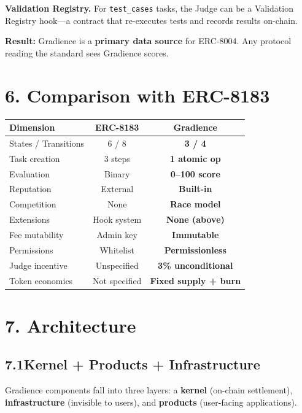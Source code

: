 \documentclass[11pt,a4paper]{article}
\begin{document}
\textbf{Validation Registry.} For \texttt{test\_cases} tasks, the Judge can be a Validation Registry hook---a contract that re-executes tests and records results on-chain.

\textbf{Result:} Gradience is a \textbf{primary data source} for ERC-8004. Any protocol reading the standard sees Gradience scores.

\section{6. Comparison with ERC-8183}

\begin{table}[H]\centering\small
\begin{tabular}{@{}lcc@{}}
\toprule
\textbf{Dimension} & \textbf{ERC-8183} & \textbf{Gradience} \\
\midrule
States / Transitions & 6 / 8 & \textbf{3 / 4} \\
Task creation & 3 steps & \textbf{1 atomic op} \\
Evaluation & Binary & \textbf{0--100 score} \\
Reputation & External & \textbf{Built-in} \\
Competition & None & \textbf{Race model} \\
Extensions & Hook system & \textbf{None (above)} \\
Fee mutability & Admin key & \textbf{Immutable} \\
Permissions & Whitelist & \textbf{Permissionless} \\
Judge incentive & Unspecified & \textbf{3\% unconditional} \\
Token economics & Not specified & \textbf{Fixed supply + burn} \\
\bottomrule
\end{tabular}
\end{table}

\section{7. Architecture}

\subsection{7.1\quad Kernel + Products + Infrastructure}

Gradience components fall into three layers: a \textbf{kernel} (on-chain settlement), \textbf{infrastructure} (invisible to users), and \textbf{products} (user-facing applications).
\end{document}
